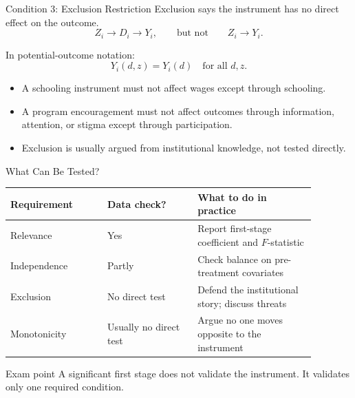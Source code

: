 \documentclass[11pt,aspectratio=169]{beamer}
\begin{document}
\begin{frame}{Condition 3: Exclusion Restriction}
  Exclusion says the instrument has no direct effect on the outcome.
  \[
    Z_i \rightarrow D_i \rightarrow Y_i,
    \qquad
    \text{but not}
    \qquad
    Z_i \rightarrow Y_i.
  \]

  In potential-outcome notation:
  \[
    Y_i(d,z)=Y_i(d)
    \quad \text{for all } d,z.
  \]

  \begin{itemize}
    \item A schooling instrument must not affect wages except through schooling.
    \item A program encouragement must not affect outcomes through information, attention, or stigma except through participation.
    \item Exclusion is usually argued from institutional knowledge, not tested directly.
  \end{itemize}
\end{frame}

\begin{frame}{What Can Be Tested?}
  \begin{center}
  \begin{tabular}{p{0.28\linewidth}p{0.26\linewidth}p{0.34\linewidth}}
    \toprule
    Requirement & Data check? & What to do in practice \\
    \midrule
    Relevance & Yes & Report first-stage coefficient and \(F\)-statistic \\
    Independence & Partly & Check balance on pre-treatment covariates \\
    Exclusion & No direct test & Defend the institutional story; discuss threats \\
    Monotonicity & Usually no direct test & Argue no one moves opposite to the instrument \\
    \bottomrule
  \end{tabular}
  \end{center}

  \begin{block}{Exam point}
    A significant first stage does not validate the instrument. It validates only one required condition.
  \end{block}
\end{frame}
\end{document}
